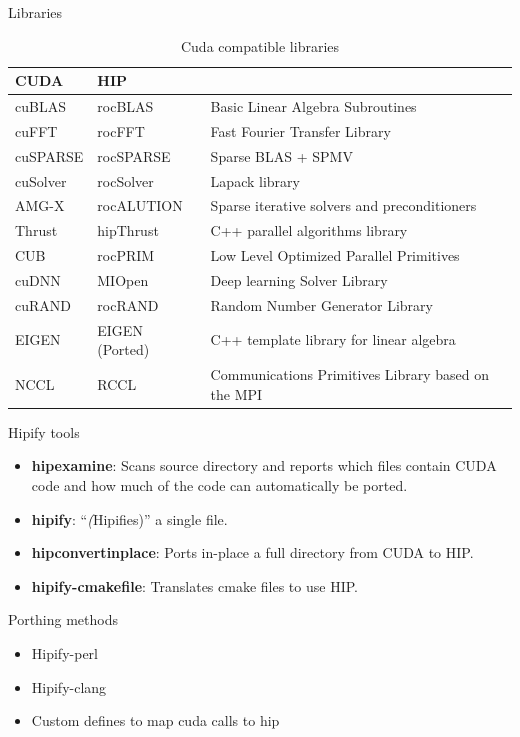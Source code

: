 \documentclass[aspectratio=169]{beamer}
\begin{document}
\begin{frame}{Libraries}
\begin{table}[]
    \centering
    \begin{tabular}{l|l|l}
CUDA & HIP & \\
\hline
cuBLAS &	rocBLAS &	Basic Linear Algebra Subroutines\\
cuFFT &	rocFFT &	Fast Fourier Transfer Library\\
cuSPARSE &	rocSPARSE &	Sparse BLAS + SPMV\\
cuSolver &	rocSolver &	Lapack library\\
AMG-X &	rocALUTION & 	Sparse iterative solvers and preconditioners\\
Thrust& 	hipThrust &	C++ parallel algorithms library\\
CUB &	rocPRIM &	Low Level Optimized Parallel Primitives\\
cuDNN 	&MIOpen &	Deep learning Solver Library\\
cuRAND &	rocRAND &	Random Number Generator Library\\
EIGEN &	EIGEN (Ported) &	C++ template library for linear algebra\\
NCCL &	RCCL &	Communications Primitives Library based on the MPI  \\
\end{tabular}
    \caption{Cuda compatible libraries}
    \label{tab:my_label}
\end{table}
\end{frame}

\begin{frame}{Hipify tools}
\begin{itemize}
    \item \textbf{hipexamine}:
        Scans source directory and reports which files contain CUDA code and how much of the code can automatically be ported.
    \item \textbf{hipify}:
        ``\textit(Hipifies)'' a single file.
    \item \textbf{hipconvertinplace}:
         Ports in-place a full directory from CUDA to HIP.
    \item \textbf{hipify-cmakefile}:
          Translates cmake files to use HIP.
\end{itemize}
\end{frame}


\begin{frame}{Porthing methods}
\begin{itemize}
    \item Hipify-perl 
    \item Hipify-clang
    \item Custom defines to map cuda calls to hip
\end{itemize}
\end{frame}
\end{document}
